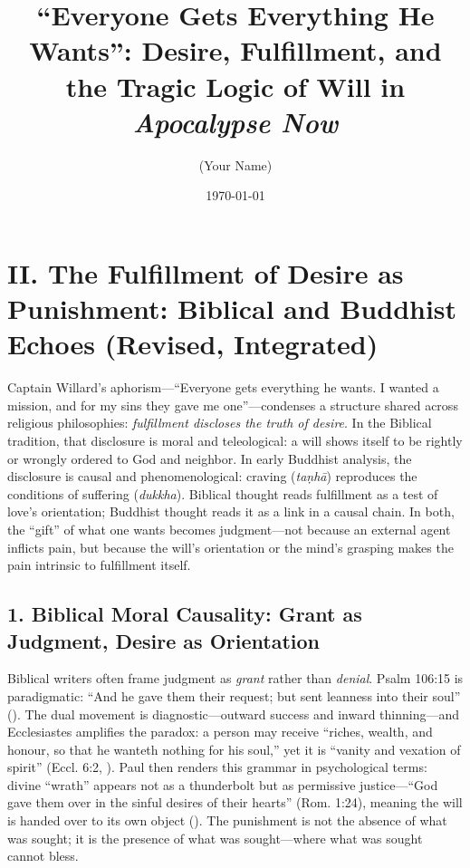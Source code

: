 \documentclass[12pt]{article}
\title{“Everyone Gets Everything He Wants”: Desire, Fulfillment, and the Tragic Logic of Will in \textit{Apocalypse Now}}
\author{(Your Name)}
\date{\today}
\begin{document}
\maketitle

\section*{II. The Fulfillment of Desire as Punishment: Biblical and Buddhist Echoes (Revised, Integrated)}

Captain Willard’s aphorism---``Everyone gets everything he wants. I wanted a mission, and for my sins they gave me one''---condenses a structure shared across religious philosophies: \emph{fulfillment discloses the truth of desire}. In the Biblical tradition, that disclosure is moral and teleological: a will shows itself to be rightly or wrongly ordered to God and neighbor. In early Buddhist analysis, the disclosure is causal and phenomenological: craving (\emph{taṇhā}) reproduces the conditions of suffering (\emph{dukkha}). Biblical thought reads fulfillment as a test of love’s orientation; Buddhist thought reads it as a link in a causal chain. In both, the ``gift'' of what one wants becomes judgment---not because an external agent inflicts pain, but because the will’s orientation or the mind’s grasping makes the pain intrinsic to fulfillment itself.

\subsection*{1. Biblical Moral Causality: Grant as Judgment, Desire as Orientation}

Biblical writers often frame judgment as \emph{grant} rather than \emph{denial}. Psalm 106:15 is paradigmatic: ``And he gave them their request; but sent leanness into their soul'' (\parencite{KJV2017}). The dual movement is diagnostic---outward success and inward thinning---and Ecclesiastes amplifies the paradox: a person may receive ``riches, wealth, and honour, so that he wanteth nothing for his soul,'' yet it is ``vanity and vexation of spirit'' (Eccl. 6:2, \parencite{KJV2017}). Paul then renders this grammar in psychological terms: divine ``wrath'' appears not as a thunderbolt but as permissive justice---``God gave them over in the sinful desires of their hearts'' (Rom. 1:24), meaning the will is handed over to its own object (\parencite{FitzmyerRomans1993}). The punishment is not the absence of what was sought; it is the presence of what was sought---where what was sought cannot bless.
\end{document}

